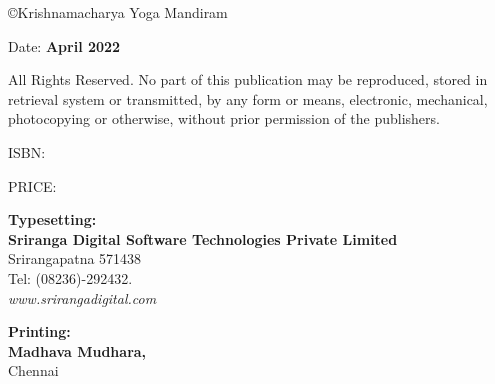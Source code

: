 \thispagestyle{empty}

{\small\copyright{Krishnamacharya Yoga Mandiram}}
\bigskip

Date: \textbf{April 2022}
\vfill

{\small
All Rights Reserved. No part of this publication may be reproduced, stored in retrieval system or 
transmitted, by any form or means, electronic, mechanical, photocopying or otherwise, without 
prior permission of the publishers.}
\vspace{1cm}

ISBN: 
\bigskip

PRICE:
\vfill

\textbf{Typesetting:}\\[4pt] 
\textbf{Sriranga Digital Software Technologies Private Limited}\\ 
Srirangapatna 571438\\ 
Tel: (08236)-292432.\\ 
\textit{www.srirangadigital.com}
\vfill

\textbf{Printing:}\\ 
\textbf{Madhava Mudhara,}\\ 
Chennai

